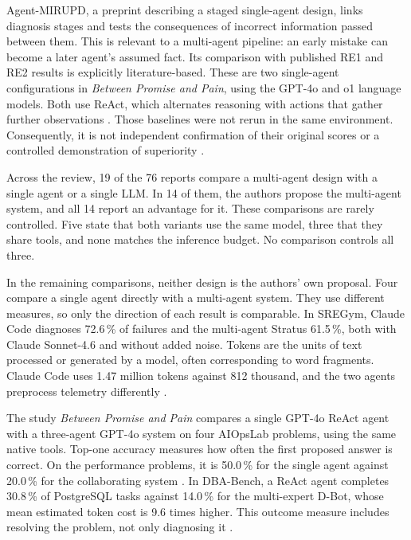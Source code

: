 Agent-MIRUPD, a preprint describing a staged single-agent design, links
diagnosis stages and tests the consequences of incorrect information
passed between them. This is relevant to a multi-agent pipeline: an early
mistake can become a later agent's assumed fact. Its comparison with
published RE1 and RE2 results is explicitly
literature-based. These are two single-agent configurations in
\emph{Between Promise and Pain}, using the GPT-4o and o1 language models. Both use ReAct,
which alternates reasoning with actions that gather further observations
\parencite[Section~2, Table~1]{cornacchia2025promise}.
Those baselines were not rerun in the same environment.
Consequently, it is not independent confirmation of their original scores
or a controlled demonstration of superiority
\parencite[Sections~6.3--6.4]{rasouli2026agentmirupd}.

Across the review, 19 of the 76 reports compare a multi-agent design
with a single agent or a single LLM. In 14 of them, the authors propose
the multi-agent system, and all 14 report an advantage for it. These
comparisons are rarely controlled. Five state that both variants use the
same model, three that they share tools, and none matches the inference
budget. No comparison controls all three.

In the remaining comparisons, neither design is the authors' own
proposal. Four compare a single agent directly with a multi-agent system.
They use different measures, so only the direction of each result is
comparable. In SREGym, Claude Code diagnoses 72.6\,\% of failures and
the multi-agent Stratus 61.5\,\%, both with Claude Sonnet-4.6 and without
added noise. Tokens are the units of text processed or generated by a model,
often corresponding to word fragments.
Claude Code uses 1.47 million tokens against 812 thousand,
and the two agents preprocess telemetry differently
\parencite[Table~3]{clark2026sregym}.

The study \emph{Between Promise and Pain} compares a single GPT-4o ReAct
agent with a three-agent GPT-4o system on four AIOpsLab problems, using the
same native tools. Top-one accuracy measures how often the first proposed
answer is correct. On the performance problems, it is
50.0\,\% for the single agent against 20.0\,\% for the collaborating system
\parencite[Table~4]{cornacchia2025promise}. In DBA-Bench, a ReAct agent
completes 30.8\,\% of PostgreSQL tasks against 14.0\,\% for the multi-expert
D-Bot, whose mean estimated token cost is 9.6 times higher. This outcome
measure includes resolving the problem, not only diagnosing it
\parencite[Section~6.5]{chen2026dbabench}.

